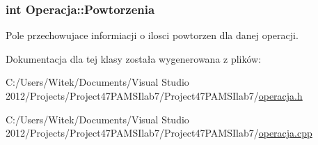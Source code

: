 \hypertarget{class_operacja_aa568b17d05f31132b3d97eb5b7e93d61}{
\subsubsection[{Powtorzenia}]{\setlength{\rightskip}{0pt plus 5cm}int Operacja\-::\-Powtorzenia}}\label{class_operacja_aa568b17d05f31132b3d97eb5b7e93d61}


Pole przechowujace informiacji o ilosci powtorzen dla danej operacji. 



Dokumentacja dla tej klasy została wygenerowana z plików\-:\begin{DoxyCompactItemize}
\item 
C\-:/\-Users/\-Witek/\-Documents/\-Visual Studio 2012/\-Projects/\-Project47\-P\-A\-M\-S\-Ilab7/\-Project47\-P\-A\-M\-S\-Ilab7/\hyperlink{operacja_8h}{operacja.\-h}\item 
C\-:/\-Users/\-Witek/\-Documents/\-Visual Studio 2012/\-Projects/\-Project47\-P\-A\-M\-S\-Ilab7/\-Project47\-P\-A\-M\-S\-Ilab7/\hyperlink{operacja_8cpp}{operacja.\-cpp}\end{DoxyCompactItemize}
